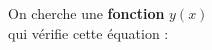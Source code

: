 \documentclass[preview]{standalone}
\begin{document}
\begin{center}
On cherche une \textbf{fonction} $y(x)$\\qui vérifie cette équation :
\end{center}
\end{document}
